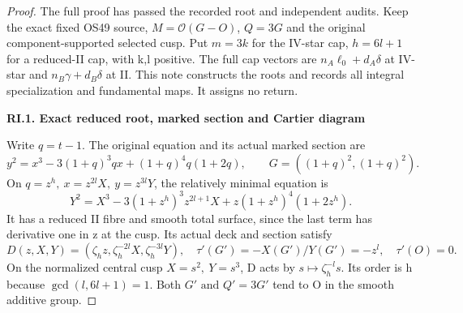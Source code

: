 \begin{proof}
The full proof has passed the recorded root and independent audits. Keep the exact fixed OS49 source,
\(M=\mathcal O(G-O)\), \(Q=3G\) and the original component-supported selected cusp. Put
\(m=3k\) for the IV-star cap, \(h=6l+1\) for a reduced-II cap, with k,l positive.
The full cap vectors are \(n_A\ell_0+d_A\delta\) at IV-star and
\(n_B\gamma+d_B\delta\) at II. This note constructs the roots and records
all integral specialization and fundamental maps. It assigns no return.

\par

\medskip\noindent\textbf{RI.1. Exact reduced root, marked section and Cartier diagram}

\par\nobreak

Write \(q=t-1\). The original equation and its actual marked section are
\[
 y^2=x^3-3(1+q)^3q x+(1+q)^4q(1+2q),\qquad
                         G=((1+q)^2,(1+q)^2).
\]
On \(q=z^h,\ x=z^{2l}X,\ y=z^{3l}Y\), the relatively minimal equation is
\[
 Y^2=X^3-3(1+z^h)^3z^{2l+1}X
                 +z(1+z^h)^4(1+2z^h).                  \tag{RI.1}
\]
It has a reduced II fibre and smooth total surface, since the last
term has derivative one in z at the cusp. Its actual deck and section
satisfy
\[
 D(z,X,Y)=(\zeta_hz,\zeta_h^{-2l}X,\zeta_h^{-3l}Y),
 \quad \tau'(G')=-X(G')/Y(G')=-z^l,\quad \tau'(O)=0.    \tag{RI.2}
\]
On the normalized central cusp \(X=s^2,\ Y=s^3\), D acts by
\(s\mapsto\zeta_h^{-l}s\). Its order is h because \(\gcd(l,6l+1)=1\).
Both \(G'\text{ and }Q'=3G'\) tend to O in the smooth additive group.


\end{proof}
